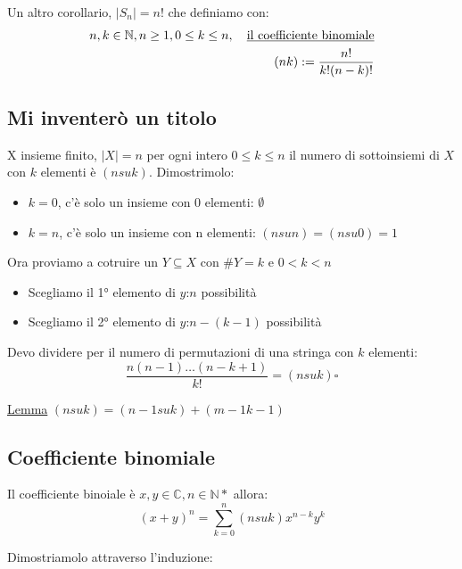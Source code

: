 \documentclass{article}
\begin{document}
Un altro corollario, $|S_n| = n$! che definiamo con:
\begin{align*}
        n,k \in \mathbb{N}, n \ge 1, 0 \le k \le n, \quad \mbox{\underline{il coefficiente binomiale}} \\
        (n k) := \frac{n!}{k!(n-k)!}
\end{align*}




\subsection{Mi inventerò un titolo}
X insieme finito, $|X| = n$ per ogni intero $0 \le k \le n$ il numero di sottoinsiemi di $X$ con $k$ elementi è $(n su k)$.
Dimostrimolo:
\begin{itemize}
        \item $k=0$, c'è solo un insieme con 0 elementi: $\emptyset$
        \item $k=n$, c'è solo un insieme con n elementi: $(n su n) = (n su 0) = 1$
\end{itemize}

Ora proviamo a cotruire un $Y \subseteq X$ con $\#Y = k$ e $0 < k < n$ \par
\begin{itemize}
        \item Scegliamo il 1° elemento di $y$:$n$ possibilità
        \item Scegliamo il 2° elemento di $y$:$n-(k-1)$ possibilità
\end{itemize}

Devo dividere per il numero di permutazioni di una stringa con $k$ elementi:
\begin{equation*}
        \frac{n(n-1)\ldots(n-k+1)}{k!} = (n su k) \square
\end{equation*}

\underline{Lemma} $(n su k) = (n-1 su k) + (m-1 k-1)$ 



\subsection{Coefficiente binomiale}
Il coefficiente binoiale è $x,y \in \mathbb{C}, n \in \mathbb{N}*$ allora:
\begin{equation*}
        {(x+y)}^{n} = \sum_{k=0}^{n}(n su k)x^{n-k}y^k
\end{equation*}

Dimostriamolo attraverso l'induzione: \newline
{}
\end{document}
